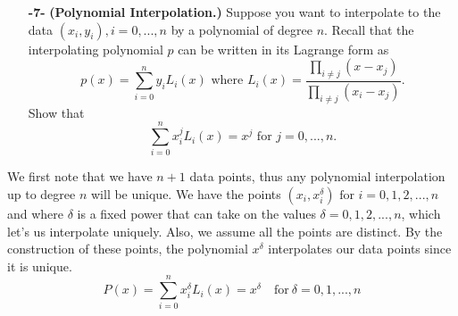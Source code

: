 \documentclass[11pt]{article}
\theoremstyle{definition}
\newcommand{\1}[1]{\mathbf{1} \left \{ #1 \right \}}
\begin{document}
\begin{itemize}
    \item[{\textbf{-7-}}] \textbf{(Polynomial Interpolation.)}  Suppose you want to interpolate to the data $(x_i, y_i), i=0,..., n$ by a polynomial of degree $n$.  Recall that the interpolating polynomial $p$ can be written in its Lagrange form as
    \begin{equation}
        p(x) = \sum_{i=0}^n y_i L_i (x) \text{  where  } L_i (x) = \frac{\prod_{i \neq j}(x - x_j)}{\prod_{i \neq j}(x_i - x_j)}.
    \end{equation}
    Show that
    \begin{equation}
        \sum_{i=0}^n x_i^j L_i (x) = x^j \text{  for  } j=0,..., n.
    \end{equation}
\end{itemize}
We first note that we have $n+1$ data points, thus any polynomial interpolation up to degree $n$ will be unique.  We have the points \(\left(x_i , x_i^{\delta}\right) \text{ for } i=0,1,2,...,n\) and where $\delta$ is a fixed power that can take on the values $\delta = 0,1,2,...,n$, which let's us interpolate uniquely.  Also, we assume all the points are distinct.  By the construction of these points, the polynomial $x^{\delta}$ interpolates our data points since it is unique.
\[P(x) = \sum_{i=0}^n x_i^{\delta} L_i (x) = x^{\delta} \quad \text{for} \ \delta = 0,1,...,n\]
\end{document}
